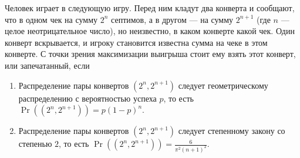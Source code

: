 \documentclass[12pt]{article}
\begin{document}
Человек играет в следующую игру. Перед ним кладут два конверта и сообщают, что в одном чек на сумму $2^n$ септимов, а в другом --- на сумму $2^{n + 1}$ (где $n$ --- целое неотрицательное число), но неизвестно, в каком конверте какой чек. Один конверт вскрывается, и игроку становится известна сумма на чеке в этом конверте. С точки зрения максимизации выигрыша стоит ему взять этот конверт, или запечатанный, если

\begin{enumerate}
    \item Распределение пары конвертов $(2^n, 2^{n + 1})$ следует геометрическому распределению с вероятностью успеха $p$, то есть $\Pr((2^n, 2^{n + 1})) = p(1 - p)^n$.
    \item Распределение пары конвертов $(2^n, 2^{n + 1})$ следует степенному закону со степенью $2$, то есть $\Pr((2^n, 2^{n + 1})) = \frac{6}{\pi^2 (n + 1)^2}$.
\end{enumerate}
\end{document}
